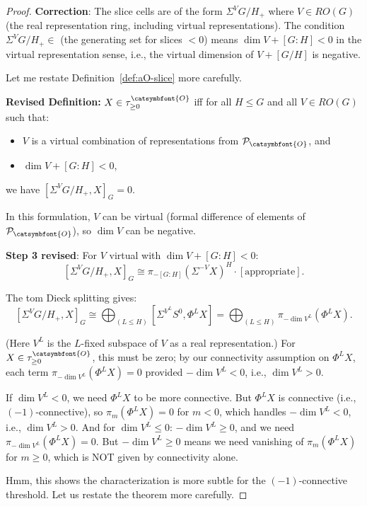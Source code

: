 \documentclass[12pt]{article}
\theoremstyle{definition}
\newcommand{\aO}{{\catsymbfont{O}}}
\begin{document}
\begin{proof}
\textbf{Correction}: The slice cells are of the form $\Sigma^V G/H_+$ where $V\in RO(G)$ (the real representation ring, including virtual representations). The condition $\Sigma^V G/H_+\in$ (the generating set for slices $< 0$) means $\dim V + [G:H] < 0$ in the virtual representation sense, i.e., the virtual dimension of $V + [G/H]$ is negative.

Let me restate Definition~\ref{def:aO-slice} more carefully.

\textbf{Revised Definition:} $X\in\tau_{\geq 0}^{\aO}$ iff for all $H\leq G$ and all $V\in RO(G)$ such that:
\begin{itemize}
\item $V$ is a virtual combination of representations from $\mathcal{P}_\aO$, and
\item $\dim V + [G:H] < 0$,
\end{itemize}
we have $[\Sigma^V G/H_+, X]_G = 0$.

In this formulation, $V$ can be virtual (formal difference of elements of $\mathcal{P}_\aO$), so $\dim V$ can be negative.

\textbf{Step 3 revised}: For $V$ virtual with $\dim V + [G:H] < 0$:
$$[\Sigma^V G/H_+, X]_G \cong \pi_{-[G:H]}(\Sigma^{-V} X)^H \cdot [\text{appropriate}].$$

The tom Dieck splitting gives:
$$[\Sigma^V G/H_+, X]_G \cong \bigoplus_{(L\leq H)}[\Sigma^{V^L}S^0, \Phi^L X] = \bigoplus_{(L\leq H)}\pi_{-\dim V^L}(\Phi^L X).$$

(Here $V^L$ is the $L$-fixed subspace of $V$ as a real representation.) For $X\in\tau_{\geq 0}^{\aO}$, this must be zero; by our connectivity assumption on $\Phi^L X$, each term $\pi_{-\dim V^L}(\Phi^L X) = 0$ provided $-\dim V^L < 0$, i.e., $\dim V^L > 0$.

If $\dim V^L < 0$, we need $\Phi^L X$ to be more connective. But $\Phi^L X$ is connective (i.e., $(-1)$-connective), so $\pi_m(\Phi^L X) = 0$ for $m<0$, which handles $-\dim V^L < 0$, i.e., $\dim V^L > 0$. And for $\dim V^L \leq 0$: $-\dim V^L \geq 0$, and we need $\pi_{-\dim V^L}(\Phi^L X) = 0$. But $-\dim V^L \geq 0$ means we need vanishing of $\pi_m(\Phi^L X)$ for $m\geq 0$, which is NOT given by connectivity alone.

Hmm, this shows the characterization is more subtle for the $(-1)$-connective threshold. Let us restate the theorem more carefully.

\end{proof}
\end{document}
